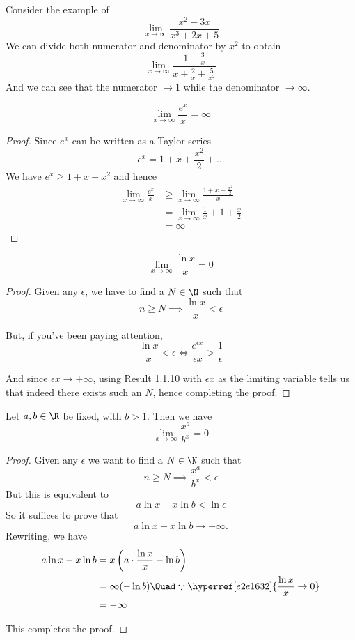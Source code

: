 \begin{compute}
	Consider the example of
	$$
		\lim_{x\to\infty}\frac{x^2 - 3x}{x^3 + 2x + 5}
	$$
	We can divide both numerator and denominator by $x^2$ to obtain
	$$
		\lim_{x\to\infty}\frac{1 - \frac3x}{x + \frac2x + \frac5{x^2}}
	$$
	And we can see that the numerator $\to1$ while the denominator
	$\to\infty$.
\end{compute}

\label{b905ee7}
$$
	\lim_{x\to\infty}\frac{e^x}x=\infty
$$

\begin{proof}
	Since $e^x$ can be written as a Taylor series
	$$
		e^x=1 + x + \frac{x^2}2 +\ldots
	$$
	We have $e^x\geq 1 + x + x^2$ and hence
	\begin{align*}
		\lim_{x\to\infty}\frac{e^x}x
		 & \geq\lim_{x\to\infty}\frac{1+x+\frac{x^2}2}x \\
		 & =\lim_{x\to\infty}\frac1x + 1 + \frac{x}2    \\
		 & = \infty
	\end{align*}
\end{proof}


\label{e2e1632}
$$
	\lim_{x\to\infty}\frac{\ln x}x = 0
$$

\begin{proof}
	Given any $\epsilon$, we have to find a $N\in\N$ such that
	$$
		n\geq N\implies\frac{\ln x}x<\epsilon
	$$

	But, if you've been paying attention,
	$$
		\frac{\ln x}x<\epsilon\iff\frac{e^{\epsilon x}}{\epsilon x}>\frac1\epsilon
	$$

	And since $\epsilon x\to+\infty$, using \hyperref[b905ee7]{Result
		1.1.10} with $\epsilon x$ as the limiting variable tells us that
	indeed there exists such an $N$, hence completing the proof.
\end{proof}

\label{f3540b0}

Let $a,b\in\R$ be fixed, with $b>1$. Then we have
$$
	\lim_{x\to\infty}\frac{x^a}{b^x}=0
$$

\begin{proof}
	Given any $\epsilon$ we want to find a $N\in\N$ such that
	$$
		n\geq N\implies\frac{x^a}{b^x}<\epsilon
	$$
	But this is equivalent to
	$$
		a\ln x-x\ln b<\ln\epsilon
	$$
	So it suffices to prove that
	$$
		a\ln x-x\ln b\to-\infty.
	$$
	Rewriting, we have
	\begin{align*}
		a\ln x-x\ln b
		 & = x\left(a\cdot\frac{\ln x}{x}-\ln b\right)                           \\
		 & = \infty(-\ln b) \Quad\because\hyperref[e2e1632]{\frac{\ln x}{x}\to0} \\
		 & = -\infty
	\end{align*}

	This completes the proof.
\end{proof}

